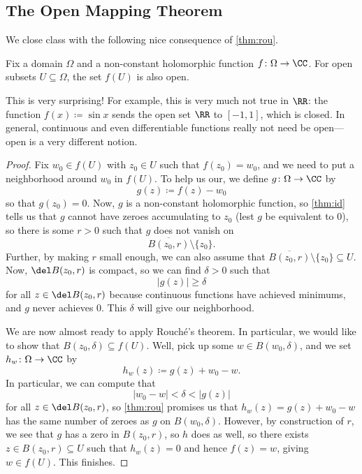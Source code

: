 \documentclass[../notes.tex]{subfiles}
\begin{document}
\subsection{The Open Mapping Theorem}
We close class with the following nice consequence of \autoref{thm:rou}.
\begin{theorem} \label{thm:openmap}
	Fix a domain $\Omega$ and a non-constant holomorphic function $f\colon \Omega\to\CC$. For open subsets $U\subseteq\Omega$, the set $f(U)$ is also open.
\end{theorem}
This is very surprising! For example, this is very much not true in $\RR$: the function $f(x)\coloneqq \sin x$ sends the open set $\RR$ to $[-1,1]$, which is closed. In general, continuous and even differentiable functions really not need be open---open is a very different notion.
\begin{proof}
	Fix $w_0\in f(U)$ with $z_0\in U$ such that $f(z_0)=w_0$, and we need to put a neighborhood around $w_0$ in $f(U)$. To help us our, we define $g\colon \Omega\to\CC$ by
	\[g(z)\coloneqq f(z)-w_0\]
	so that $g(z_0)=0$. Now, $g$ is a non-constant holomorphic function, so \autoref{thm:id} tells us that $g$ cannot have zeroes accumulating to $z_0$ (lest $g$ be equivalent to $0$), so there is some $r>0$ such that $g$ does not vanish on
	\[\overline{B(z_0,r)}\setminus\{z_0\}.\]
	Further, by making $r$ small enough, we can also assume that $\overline{B(z_0,r)}\setminus\{z_0\}\subseteq U$. Now, $\del B(z_0,r)$ is compact, so we can find $\delta>0$ such that
	\[|g(z)|\ge\delta\]
	for all $z\in\del B(z_0,r)$ because continuous functions have achieved minimums, and $g$ never achieves $0$. This $\delta$ will give our neighborhood.

	We are now almost ready to apply Rouch\'e's theorem. In particular, we would like to show that $B(z_0,\delta)\subseteq f(U)$. Well, pick up some $w\in B(w_0,\delta)$, and we set $h_w\colon \Omega\to\CC$ by
	\[h_w(z)\coloneqq g(z)+w_0-w.\]
	In particular, we can compute that
	\[|w_0-w|<\delta<|g(z)|\]
	for all $z\in\del B(z_0,r)$, so \autoref{thm:rou} promises us that $h_w(z)=g(z)+w_0-w$ has the same number of zeroes as $g$ on $B(w_0,\delta)$. However, by construction of $r$, we see that $g$ has a zero in $B(z_0,r)$, so $h$ does as well, so there exists $z\in B(z_0,r)\subseteq U$ such that $h_w(z)=0$ and hence $f(z)=w$, giving $w\in f(U)$. This finishes.
\end{proof}
\end{document}
